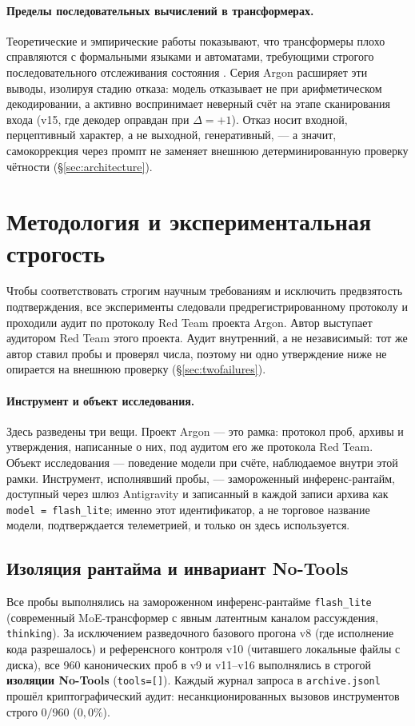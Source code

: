 \documentclass[11pt,a4paper]{article}
\begin{document}
\paragraph{Пределы последовательных вычислений в трансформерах.} Теоретические и эмпирические работы показывают, что трансформеры плохо справляются с формальными языками и автоматами, требующими строгого последовательного отслеживания состояния \cite{deletang2023neural}. Серия Argon расширяет эти выводы, изолируя стадию отказа: модель отказывает не при арифметическом декодировании, а активно воспринимает неверный счёт на этапе сканирования входа (v15, где декодер оправдан при $\Delta = +1$). Отказ носит входной, перцептивный характер, а не выходной, генеративный, — а значит, самокоррекция через промпт не заменяет внешнюю детерминированную проверку чётности (\S\ref{sec:architecture}).

\section{Методология и экспериментальная строгость}

Чтобы соответствовать строгим научным требованиям и исключить предвзятость подтверждения, все эксперименты следовали предрегистрированному протоколу и проходили аудит по протоколу Red Team проекта Argon. Автор выступает аудитором Red Team этого проекта. Аудит внутренний, а не независимый: тот же автор ставил пробы и проверял числа, поэтому ни одно утверждение ниже не опирается на внешнюю проверку (\S\ref{sec:twofailures}).

\paragraph{Инструмент и объект исследования.} Здесь разведены три вещи. Проект Argon — это рамка: протокол проб, архивы и утверждения, написанные о них, под аудитом его же протокола Red Team. Объект исследования — поведение модели при счёте, наблюдаемое внутри этой рамки. Инструмент, исполнявший пробы, — замороженный инференс-рантайм, доступный через шлюз Antigravity и записанный в каждой записи архива как \texttt{model = flash\_lite}; именно этот идентификатор, а не торговое название модели, подтверждается телеметрией, и только он здесь используется.

\subsection{Изоляция рантайма и инвариант No-Tools}
Все пробы выполнялись на замороженном инференс-рантайме \texttt{flash\_lite} (современный MoE-трансформер с явным латентным каналом рассуждения, \texttt{thinking}). За исключением разведочного базового прогона v8 (где исполнение кода разрешалось) и референсного контроля v10 (читавшего локальные файлы с диска), все 960 канонических проб в v9 и v11--v16 выполнялись в строгой \textbf{изоляции No-Tools} (\texttt{tools=[]}). Каждый журнал запроса в \texttt{archive.jsonl} прошёл криптографический аудит: несанкционированных вызовов инструментов строго $0/960$ ($0{,}0\%$).
\end{document}
